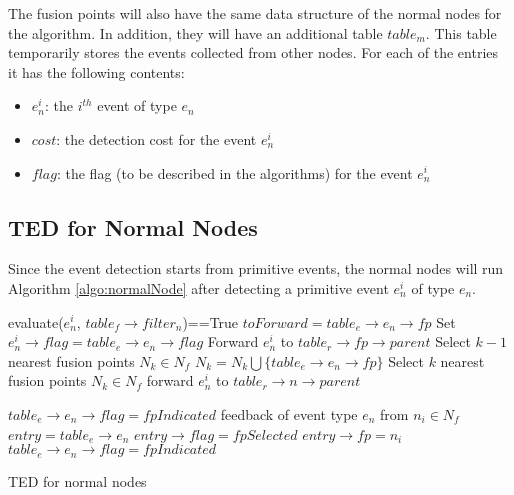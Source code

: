 The fusion points will also have the same data structure of the normal nodes for the algorithm. In addition, they will have an additional table \(table_m\). This table temporarily stores the events collected from other nodes. For each of the entries it has the following contents: 
\begin{itemize}
\item \(e^i_n\): the \(i^{th}\) event of type \(e_n\)
\item \(cost\): the detection cost for the event \(e^i_n\)
\item \(flag\): the flag (to be described in the algorithms) for the event \(e^i_n\)
\end{itemize}

\subsection{TED for Normal Nodes}
Since the event detection starts from primitive events, the normal nodes will run Algorithm \ref{algo:normalNode} after detecting a primitive event \(e^i_n\) of type \(e_n\).
\begin{algorithm}
\begin{algorithmic}[1]
\REQUIRE evaluate(\(e^i_n\), \(table_f\rightarrow filter_n\))==True
		\STATE \(toForward=table_e\rightarrow e_n\rightarrow fp\)
		\STATE Set \(e^i_n\rightarrow flag=table_e\rightarrow e_n\rightarrow flag\)
		\STATE Forward \(e^i_n\) to \(table_r\rightarrow fp\rightarrow parent\)
	\ELSE
			\STATE Select \(k-1\) nearest fusion points \(N_k\in N_f\)
			\STATE \(N_k=N_k\bigcup \{table_e\rightarrow e_n\rightarrow fp\}\)
		\ELSE
			\STATE Select \(k\) nearest fusion points \(N_k\in N_f\)
		\ENDIF
			\STATE forward \(e^i_n\) to \(table_r\rightarrow n\rightarrow parent\)
		\ENDFOR
	\ENDIF
	
		\STATE \(table_e\rightarrow e_n\rightarrow flag=fpIndicated\)
	\ENDIF
\REQUIRE feedback of event type \(e_n\) from \(n_i\in N_f\)
	\STATE \(entry=table_e\rightarrow e_n\)
		\STATE \(entry\rightarrow flag=fpSelected\)
		\STATE \(entry\rightarrow fp=n_i\)
		\STATE \(table_e\rightarrow e_n\rightarrow flag=fpIndicated\)
	\ENDIF
\end{algorithmic}
\caption{TED for normal nodes}
\label{algo:normalNode}
\end{algorithm}
